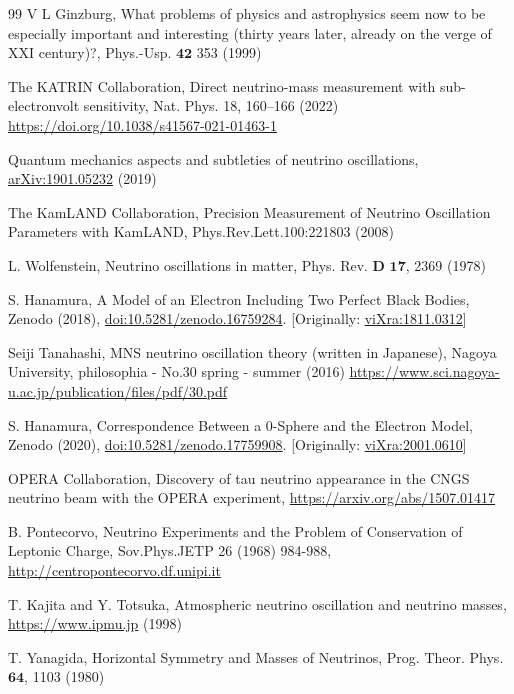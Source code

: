 \documentclass[%
 reprint,
 amsmath,amssymb,
 aps,
]{revtex4-1}
\numberwithin{equation}{section}%
\begin{document}
\begin{thebibliography}{99}
     V L Ginzburg, What problems of physics and astrophysics seem now to be especially important and interesting (thirty years later, already on the verge of XXI century)?, Phys.-Usp. $\textbf{42}$ 353 (1999)
    
     The KATRIN Collaboration, Direct neutrino-mass measurement with sub-electronvolt sensitivity, Nat. Phys. 18, 160–166 (2022) \href{https://doi.org/10.1038/s41567-021-01463-1}{https://doi.org/10.1038/s41567-021-01463-1}
    
     Quantum mechanics aspects and subtleties of neutrino oscillations, \href{https://arxiv.org/abs/1901.05232}{arXiv:1901.05232} (2019)
 
     The KamLAND Collaboration, Precision Measurement of Neutrino Oscillation Parameters with KamLAND, Phys.Rev.Lett.100:221803 (2008)
    
     L. Wolfenstein, Neutrino oscillations in matter, Phys. Rev. $\textbf{D 17}$, 2369 (1978)
    
     S. Hanamura, A Model of an Electron Including Two Perfect Black Bodies, Zenodo (2018), \href{https://doi.org/10.5281/zenodo.16759284}{doi:10.5281/zenodo.16759284}. [Originally: \href{http://vixra.org/abs/1811.0312}{viXra:1811.0312}]
    
     Seiji Tanahashi, MNS neutrino oscillation theory (written in Japanese), Nagoya University, philosophia - No.30 spring - summer (2016)
    \href{https://www.sci.nagoya-u.ac.jp/publication/files/pdf/30.pdf}{https://www.sci.nagoya-u.ac.jp/publication/files/pdf/30.pdf}
    
     S. Hanamura, Correspondence Between a 0-Sphere and the Electron Model, Zenodo (2020), \href{https://doi.org/10.5281/zenodo.17759908}{doi:10.5281/zenodo.17759908}. [Originally: \href{https://vixra.org/abs/2001.0610}{viXra:2001.0610}]
    
     OPERA Collaboration, Discovery of tau neutrino appearance in the CNGS neutrino beam with the OPERA experiment, \href{https://arxiv.org/abs/1507.01417}{https://arxiv.org/abs/1507.01417}
    
     B. Pontecorvo, Neutrino Experiments and the Problem of Conservation of Leptonic Charge, Sov.Phys.JETP 26 (1968) 984-988, \href{http://centropontecorvo.df.unipi.it/Articles/Neutrino_Experiments_and_the_Problem_of_Conservation_of_Leptonic_Charge_JETP-1968.pdf}{http://centropontecorvo.df.unipi.it}
    
     T. Kajita and Y. Totsuka, Atmospheric neutrino oscillation and neutrino masses, \href{https://www.ipmu.jp/sites/default/files/imce/E02_Feature.pdf}{https://www.ipmu.jp} (1998)
    
     T. Yanagida, Horizontal Symmetry and Masses of Neutrinos, Prog. Theor. Phys. $\textbf{64}$, 1103 (1980)
\end{thebibliography}
\end{document}

